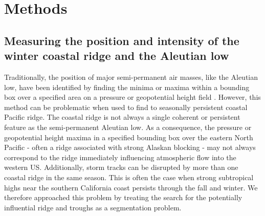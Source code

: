 \documentclass[final, double]{ua-thesis}
\begin{document}
\section{Methods}


\subsection{Measuring the position and intensity of the winter coastal ridge  and the Aleutian low}

Traditionally, the position of major semi-permanent air masses, like the Aleutian low, have been identified by finding the minima or maxima within a bounding box over a specified area on a pressure or geopotential height field \citep[e.g., ][]{2overland_decadal_1999}. However, this method can be problematic when used to find to seasonally persistent coastal Pacific ridge. The coastal ridge is not always a single coherent or persistent feature as the semi-permanent Aleutian low. As a consequence, the pressure or geopotential height maxima in a specified bounding box over the eastern North Pacific - often a ridge associated with strong Alaskan blocking \citep{2carrera_downstream_2004} - may not always correspond to the ridge immediately influencing atmospheric flow into the western US. Additionally, storm tracks can be disrupted by more than one coastal ridge in the same season. This is often the case when strong subtropical highs near the southern California coast persists through the fall and winter. We therefore approached this problem by treating the search for the potentially influential ridge and troughs as a segmentation problem.
%
%
%
\end{document}
